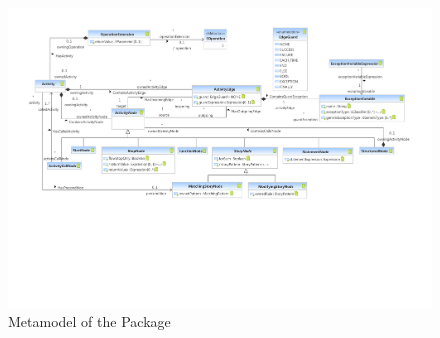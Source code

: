 %
%

\begin{figure}[htbp]
  \centering
  \includegraphics[width=\textheight,
  angle=90]{figures/A_technical-reference/packages/storydiagrams_activities/activities}
  \caption{Metamodel of the  Package}
  \label{fig:MM:activities}
\end{figure}
